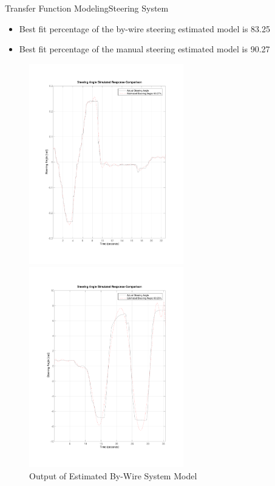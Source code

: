 \documentclass{beamer}
\begin{document}
\begin{frame}{Transfer Function Modeling}{Steering System}
	\begin{block}{}
 \begin{itemize}
	\item Best fit percentage of the by-wire steering estimated model is 83.25
	\item Best fit percentage of the manual steering estimated model is 90.27
 \end{itemize}
 \begin{figure}
    \centering
    \begin{minipage}{0.45\textwidth}
        \centering
        \includegraphics[width=0.6\textwidth]{figs/img/byWireSteeringTransferFunctionModel} %
        \caption{Output of Estimated By-Wire System Model}
        \label{fig:byWireSteerModel}
    \end{minipage}\hfill
    \begin{minipage}{0.45\textwidth}
        \centering
        \includegraphics[width=0.6\textwidth]{figs/img/manualSteeringTransferFunctionModel} %

\end{minipage}
\end{figure}
\end{block}
\end{frame}
\end{document}
